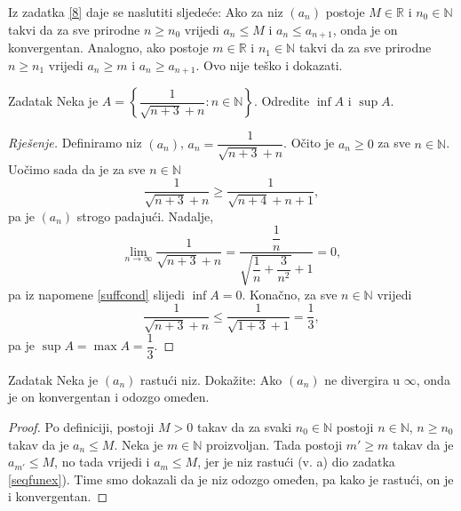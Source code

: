 \begin{remark}
\label{generalizedsandwichtheorem}
Iz zadatka \ref{8} daje se naslutiti sljedeće: Ako za niz \((a_n)\) postoje \(M\in \mathbb{R}\) i \(n_0\in \mathbb{N}\) takvi da za sve prirodne \(n\geq n_0\) vrijedi \(a_n\leq M\) i \(a_{n}\leq a_{n+1}\), onda je on konvergentan. Analogno, ako postoje \(m\in \mathbb{R}\) i \(n_1\in \mathbb{N}\) takvi da za sve prirodne \(n\geq n_1\) vrijedi \(a_n\geq m\) i \(a_{n}\geq a_{n+1}\). Ovo nije teško i dokazati.
\end{remark}
\begin{exercise}{Zadatak}
Neka je \(A=\left\{\dfrac{1}{\sqrt{n+3}+n} : n\in \mathbb{N}\right\}\). Odredite \(\inf{A}\) i \(\sup{A}\).
\end{exercise}
\begin{proof}[Rješenje]
Definiramo niz \((a_n)\), \(a_n=\dfrac{1}{\sqrt{n+3}+n}\). Očito je \(a_n\geq 0\) za sve \(n\in \mathbb{N}\). Uočimo sada da je za sve \(n\in \mathbb{N}\)
\[\dfrac{1}{\sqrt{n+3}+n}\geq \dfrac{1}{\sqrt{n+4}+n+1},\]
pa je \((a_n)\) strogo padajući. Nadalje,
\[\lim\limits_{n\to \infty}{\dfrac{1}{\sqrt{n+3}+n}}=\dfrac{\dfrac{1}{n}}{\sqrt{\dfrac{1}{n}+\dfrac{3}{n^2}}+1}=0,\]
pa iz napomene \ref{suffcond} slijedi \(\inf{A}=0\). Konačno, za sve \(n\in \mathbb{N}\) vrijedi
\[\dfrac{1}{\sqrt{n+3}+n}\leq \dfrac{1}{\sqrt{1+3}+1}=\dfrac{1}{3},\]
pa je \(\sup{A}=\max{A}=\dfrac{1}{3}\).
\end{proof}
\begin{exercise}{Zadatak}
Neka je \((a_n)\) rastući niz. Dokažite: Ako \((a_n)\) ne divergira u \(\infty\), onda je on konvergentan i odozgo omeđen.
\end{exercise}
\begin{proof}
Po definiciji, postoji \(M>0\) takav da za svaki \(n_0\in \mathbb{N}\) postoji \(n\in \mathbb{N}\), \(n\geq n_0\) takav da je \(a_n\leq M\). Neka je \(m\in \mathbb{N}\) proizvoljan. Tada postoji \(m'\geq m\) takav da je \(a_{m'}\leq M\), no tada vrijedi i \(a_m\leq M\), jer je niz rastući (v. a) dio zadatka \ref{seqfunex}). Time smo dokazali da je niz odozgo omeđen, pa kako je rastući, on je i konvergentan.
\end{proof}
